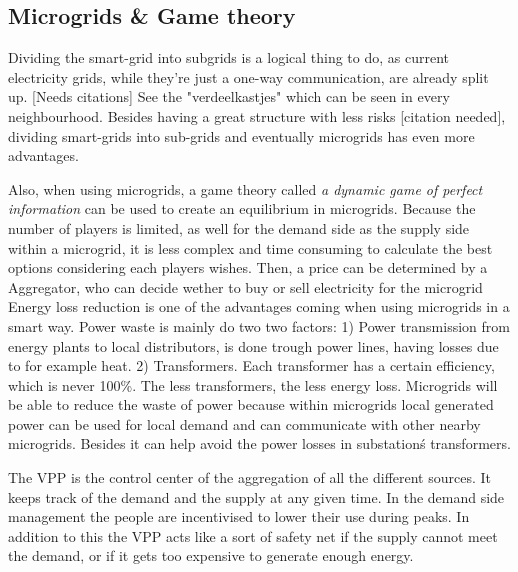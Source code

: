 \subsection{Microgrids \& Game theory}
Dividing the smart-grid into subgrids is a logical thing to do, as current electricity grids, while they're just a one-way communication, are already split up. [Needs citations] See the "verdeelkastjes" which can be seen in every neighbourhood. Besides having a great structure with less risks [citation needed], dividing smart-grids into sub-grids and eventually microgrids  has even more advantages. 

Also, when using microgrids, a game theory called \emph{a dynamic game of perfect information}  can be used to create an equilibrium in microgrids. Because the number of players is limited, as well for the demand side as the supply side within a microgrid, it is less complex and time consuming to calculate the best options considering each players wishes. Then, a price can be determined by a Aggregator, who can decide wether to buy or sell electricity for the microgrid \cite{MicrogridModellingPetrosAristidou}\linebreak \indent
Energy loss reduction is one of the advantages coming when using microgrids in a smart way. Power waste is mainly do two two factors\cite{EnergyLossURL}: 1) Power transmission from energy plants to local distributors, is done trough power lines, having losses due to for example heat. 2) Transformers. Each transformer has a certain efficiency, which is never 100\%. The less transformers, the less energy loss.\linebreak \indent
Microgrids will be able to reduce the waste of power because within microgrids local generated power can be used for local demand and can communicate with other nearby microgrids. Besides it can help avoid the power losses in substation\'s transformers\cite{keypaper}.


The VPP is the control center of the aggregation of all the different sources. It keeps track of the demand and the supply at any given time. In the demand side management the people are incentivised to lower their use during peaks. In addition to this the VPP acts like a sort of safety net if the supply cannot meet the demand, or if it gets too expensive to generate enough energy. \cite{Kumagai2012}

